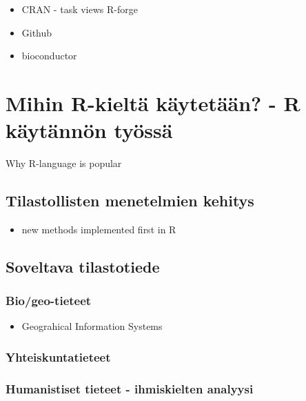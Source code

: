 \begin{itemize}
\itemsep1pt\parskip0pt
\item
  CRAN - task views R-forge
\item
  Github
\item
  bioconductor
\end{itemize}

\section{Mihin R-kieltä käytetään? - R käytännön
työssä}\label{mihin-r-kieltuxe4-kuxe4ytetuxe4uxe4n---r-kuxe4ytuxe4nnuxf6n-tyuxf6ssuxe4}

Why R-language is popular

\subsection{Tilastollisten menetelmien
kehitys}\label{tilastollisten-menetelmien-kehitys}

\begin{itemize}
\itemsep1pt\parskip0pt
\item
  new methods implemented first in R
\end{itemize}

\subsection{Soveltava tilastotiede}\label{soveltava-tilastotiede}

\subsubsection{Bio/geo-tieteet}\label{biogeo-tieteet}

\begin{itemize}
\itemsep1pt\parskip0pt
\item
  Geograhical Information Systems
\end{itemize}

\subsubsection{Yhteiskuntatieteet}\label{yhteiskuntatieteet}

\subsubsection{Humanistiset tieteet - ihmiskielten
analyysi}\label{humanistiset-tieteet---ihmiskielten-analyysi}

